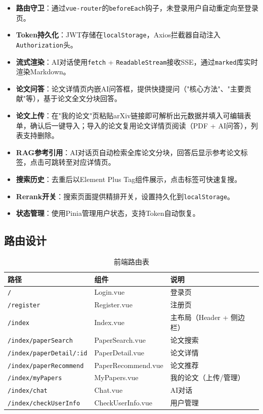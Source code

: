 \documentclass[12pt,a4paper]{ctexart}
\newcommand{\code}[1]{\texttt{#1}}
\begin{document}
\begin{itemize}
\item \textbf{路由守卫}：通过\code{vue-router}的\code{beforeEach}钩子，未登录用户自动重定向至登录页。
\item \textbf{Token持久化}：JWT存储在\code{localStorage}，Axios拦截器自动注入\code{Authorization}头。
\item \textbf{流式渲染}：AI对话使用\code{fetch} + \code{ReadableStream}接收SSE，通过\code{marked}库实时渲染Markdown。
\item \textbf{论文问答}：论文详情页内嵌AI问答框，提供快捷提问（"核心方法"、"主要贡献"等），基于论文全文分块回答。
\item \textbf{论文上传}：在"我的论文"页粘贴arXiv链接即可解析出元数据并填入可编辑表单，确认后一键导入；导入的论文复用论文详情页阅读（PDF + AI问答），列表支持删除。
\item \textbf{RAG参考引用}：AI对话页自动检索全库论文分块，回答后显示参考论文标签，点击可跳转至对应详情页。
\item \textbf{搜索历史}：去重后以Element Plus Tag组件展示，点击标签可快速复搜。
\item \textbf{Rerank开关}：搜索页面提供精排开关，设置持久化到\code{localStorage}。
\item \textbf{状态管理}：使用Pinia管理用户状态，支持Token自动恢复。
\end{itemize}

\subsection{路由设计}

\begin{table}[H]
\centering
\caption{前端路由表}
\begin{tabular}{lll}
\toprule
\textbf{路径} & \textbf{组件} & \textbf{说明} \\
\midrule
\code{/}                       & Login.vue           & 登录页 \\
\code{/register}               & Register.vue        & 注册页 \\
\code{/index}                  & Index.vue           & 主布局（Header + 侧边栏）\\
\code{/index/paperSearch}      & PaperSearch.vue     & 论文搜索 \\
\code{/index/paperDetail/:id}  & PaperDetail.vue     & 论文详情 \\
\code{/index/paperRecommend}   & PaperRecommend.vue  & 论文推荐 \\
\code{/index/myPapers}         & MyPapers.vue        & 我的论文（上传/管理）\\
\code{/index/chat}             & Chat.vue            & AI对话 \\
\code{/index/checkUserInfo}    & CheckUserInfo.vue   & 用户管理 \\
\bottomrule
\end{tabular}
\end{table}
\end{document}
